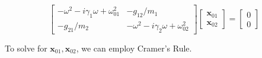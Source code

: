 \documentclass[12pt]{article}
\begin{document}
\begin{equation} 
\begin{bmatrix}
-\omega^2 - i \gamma_1 \omega + \omega_{01}^2 & -g_{12}/m_1 \\ 
-g_{21}/m_2 & -\omega^2 - i \gamma_2 \omega + \omega_{02}^2
\end{bmatrix} 
\begin{bmatrix}
\textbf{x}_{01} \\ \textbf{x}_{02}
\end{bmatrix}
= 
\begin{bmatrix}
0 \\ 0
\end{bmatrix}
\end{equation}

To solve for $\textbf{x}_{01}, \textbf{x}_{02}$, we can employ Cramer's Rule. 








\end{document}
